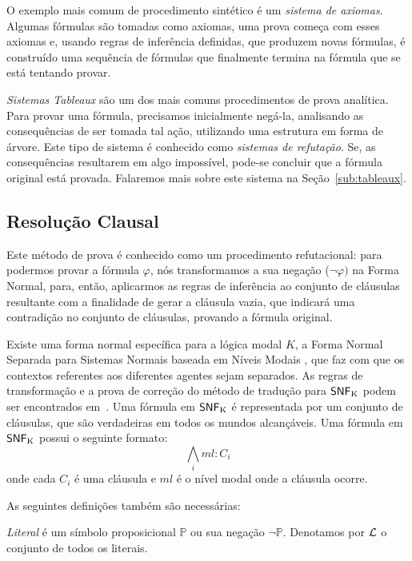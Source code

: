 O exemplo mais comum de procedimento sintético é um \textit{sistema de axiomas}.
Algumas fórmulas são tomadas como axiomas, uma prova começa com esses axiomas e,
usando regras de inferência definidas, que produzem novas fórmulas, é construído
uma sequência de fórmulas que finalmente termina na fórmula que se está tentando
provar.

\textit{Sistemas Tableaux} são um dos mais comuns procedimentos de prova
analítica. Para provar uma fórmula, precisamos inicialmente negá-la, analisando
as consequências de ser tomada tal ação, utilizando uma estrutura em forma de
árvore. Este tipo de sistema é conhecido como \textit{sistemas de refutação}.
Se, as consequências resultarem em algo impossível, pode-se concluir que a
fórmula original está provada. Falaremos mais sobre este sistema na
Seção~\ref{sub:tableaux}.


\subsection{Resolução Clausal}
\label{clausal}

Este método de prova é conhecido como um procedimento refutacional: para
podermos provar a fórmula $\varphi$, nós transformamos a sua negação ($\neg
\varphi)$ na Forma Normal, para, então, aplicarmos as regras de inferência ao
conjunto de cláusulas resultante com a finalidade de gerar a cláusula vazia, que
indicará uma contradição no conjunto de cláusulas, provando a fórmula original. 

Existe uma forma normal específica para a lógica modal $K$, a Forma Normal
Separada para Sistemas Normais baseada em Níveis Modais , que faz com
que os contextos referentes aos diferentes agentes sejam separados. As regras de
transformação e a prova de correção do método de tradução para ${\sf SNF}\mbox{$_{\mbox{\scriptsize K}}$}$ podem
ser encontrados em~\cite{DBLP:conf/tableaux/NalonHD15}. Uma fórmula em ${\sf SNF}\mbox{$_{\mbox{\scriptsize K}}$}$
é representada por um conjunto de cláusulas, que são verdadeiras em todos os
mundos alcançáveis.  Uma fórmula em ${\sf SNF}\mbox{$_{\mbox{\scriptsize K}}$}$ possui o seguinte formato:
\begin{equation} \bigwedge_i ml: C_i \end{equation} onde cada $C_i$ é uma
    cláusula e $ml$ é o nível modal onde a cláusula ocorre.

As seguintes definições também são necessárias:

\begin{definition} \textit{Literal} é um símbolo proposicional $\mathbb{P}$ ou
sua negação $\neg \mathbb{P}$. Denotamos por $\cal{L}$ o conjunto de todos os
literais.  \end{definition}

